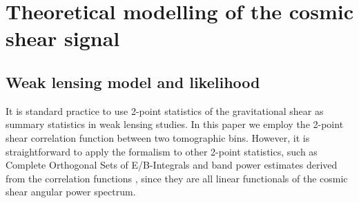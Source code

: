 \documentclass{aa}
\begin{document}


\section{Theoretical modelling of the cosmic shear signal}
\label{sec:likelihood}
\subsection{Weak lensing model and likelihood}
It is standard practice to use 2-point statistics of the gravitational shear as summary statistics in weak lensing studies. In this paper we employ the 2-point shear correlation function between two tomographic bins. However, it is straightforward to apply the formalism to other 2-point statistics, such as Complete Orthogonal Sets of E/B-Integrals \cite[COSEBIs; ][]{schneider10} and band power estimates derived from the correlation functions \citep{schneider02,becker16,vanUitert18}, since they are all linear functionals of the cosmic shear angular power spectrum. 
\end{document}
